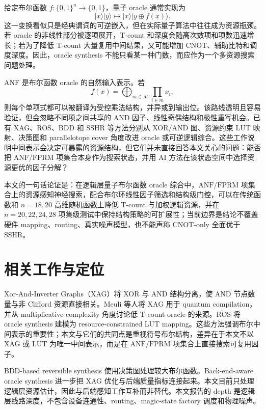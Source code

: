 \documentclass[UTF8,fontset=macnew,11pt]{ctexart}
\newcommand{\anf}{\ensuremath{\mathrm{ANF}}}
\newcommand{\fprm}{\ensuremath{\mathrm{FPRM}}}
\newcommand{\xor}{\ensuremath{\oplus}}
\begin{document}
给定布尔函数 $f:\{0,1\}^n\rightarrow\{0,1\}$，量子 oracle 通常实现为
\begin{equation}
  |x\rangle |y\rangle \mapsto |x\rangle |y\xor f(x)\rangle .
  \label{eq:oracle}
\end{equation}
这一变换看似只是经典谓词的可逆嵌入，但在实际量子算法中往往成为资源瓶颈。若 oracle 的非线性部分被逐项展开，T-count 和深度会随高次数项和项数迅速增长；若为了降低 T-count 大量复用中间结果，又可能增加 CNOT、辅助比特和调度深度。因此，oracle synthesis 不能只看某一种门数，而应作为一个多资源搜索问题处理。

\anf{} 是布尔函数 oracle 的自然输入表示。若
\begin{equation}
  f(x)=\bigoplus_{m\in\mathcal{M}}\prod_{i\in m}x_i ,
  \label{eq:anf}
\end{equation}
则每个单项式都可以被翻译为受控乘法结构，并异或到输出位。该路线透明且容易验证，但会忽略不同项之间共享的 AND 因子、线性奇偶结构和极性重写机会。已有 XAG、ROS、BDD 和 SSHR 等方法分别从 XOR/AND 图、资源约束 LUT 映射、决策图和 parallelotope cover 角度改进 oracle 或可逆逻辑综合\cite{meuli2022xag,meuli2020ros,wille2009bdd,zheng2025sshr}。这些工作说明中间表示会决定可暴露的资源结构，但它们并未直接回答本文关心的问题：能否把 \anf{}/\fprm{} 项集合本身作为搜索状态，并用 AI 方法在该状态空间中选择资源更优的因子分解？

本文的一句话论证是：在逻辑层量子布尔函数 oracle 综合中，\anf{}/\fprm{} 项集合上的资源感知神经搜索，配合布尔环线性因子筛选和结构级门控，可以在传统函数和 $n=18,20$ 高维随机函数上降低 T-count 与加权逻辑资源，并在 $n=20,22,24,28$ 项集级测试中保持结构策略的可扩展性；当前边界是结论不覆盖硬件 mapping、routing、真实噪声模型，也不能声称 CNOT-only 全面优于 SSHR。

\section{相关工作与定位}

Xor-And-Inverter Graphs（XAG）将 XOR 与 AND 结构分离，使 AND 节点数量与非 Clifford 资源直接相关。Meuli 等人将 XAG 用于 quantum compilation\cite{meuli2022xag}，并从 multiplicative complexity 角度讨论低 T-count oracle 的来源\cite{meuli2019multiplicative}。ROS 将 oracle synthesis 建模为 resource-constrained LUT mapping\cite{meuli2020ros}。这些方法强调布尔中间表示的重要性；本文与它们的共同点是重视符号布尔结构，差异在于本文不以 XAG 或 LUT 为唯一中间表示，而是在 \anf{}/\fprm{} 项集合上直接搜索可复用因子。

BDD-based reversible synthesis 使用决策图处理较大布尔函数\cite{wille2009bdd}。Back-end-aware oracle synthesis 进一步把 XAG 优化与后端质量指标连接起来\cite{yu2025backend}。本文目前只处理逻辑层资源估计，因此与后端感知工作互补而非替代。本文报告的 depth 是逻辑层线路深度，不包含设备连通性、routing、magic-state factory 调度和物理噪声。
\end{document}
